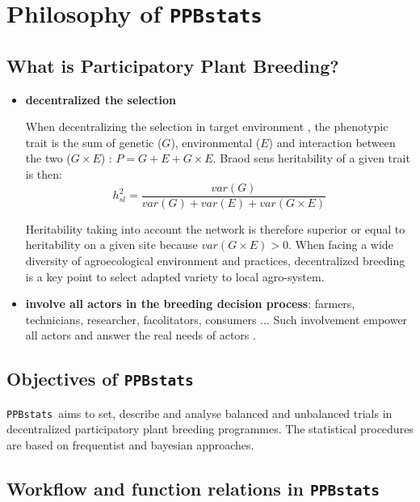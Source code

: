 \documentclass{article}\usepackage[]{graphicx}\usepackage[]{color}
\newcommand{\pack}{\texttt{PPBstats}}
\newcommand{\PPB}{Participatory Plant Breeding}
\begin{document}



\section{Philosophy of \pack}
\label{philo}

\subsection{What is \PPB ?}

\begin{itemize}
\item \textbf{decentralized the selection}

When decentralizing the selection in target environment \citep{desclaux_changes_2008}, the phenotypic trait is the sum of genetic ($G$), environmental ($E$) and interaction between the two ($G \times E$) : $P = G + E + G \times E$.
Braod sens heritability of a given trait is then:
\begin{displaymath}
h^2_{sl} = \frac{var(G)}{var(G) + var(E) + var(G\times E)}
\end{displaymath}

Heritability taking into account the network is therefore superior or equal to heritability on a given site because $var(G\times E) > 0$.
When facing a wide diversity of agroecological environment and practices, decentralized breeding is a key point to select adapted variety to local agro-system.

\item \textbf{involve all actors in the breeding decision process}: farmers, technicians, researcher, facolitators, consumers ... Such involvement empower all actors and answer the real needs of actors  \citep{sperling_framework_2001}.

\end{itemize}


\subsection{Objectives of \pack}

\pack~aims to set, describe and analyse balanced and unbalanced trials in decentralized participatory plant breeding programmes.
The statistical procedures are based on frequentist and bayesian approaches.

\subsection{Workflow and function relations in \pack}
\end{document}

